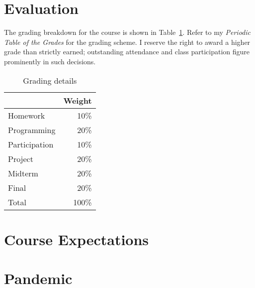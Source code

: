 \documentclass[11pt]{article}
\begin{document}
\section{Evaluation}

The grading breakdown for the course
is shown in Table~\ref{tab:grading}.
Refer to my \emph{Periodic Table of the Grades}
for the grading scheme.
I reserve the right to award a higher grade than strictly earned;
outstanding attendance and class participation
figure prominently in such decisions.

\begin{table}[htb]
  \centering
  \begin{tabular}{lr}
    \toprule
    & Weight \\
    \midrule
    Homework      & 10\%   \\
    Programming   & 20\%   \\
    Participation & 10\%   \\
    Project       & 20\%   \\
    Midterm       & 20\%   \\
    Final         & 20\%   \\
    \midrule
    Total         & 100\%  \\
    \bottomrule
  \end{tabular}
  \caption{Grading details}
  \label{tab:grading}
\end{table}
\begin{comment}
#+ORGTBL: SEND grades orgtbl-to-latex :splice nil :skip 0 :booktabs t
|               | Weight |
|               |    <r> |
|---------------+--------|
| Homework      |    10%
| Programming   |    20%
| Participation |    10%
| Project       |    20%
| Midterm       |    20%
| Final         |    20%
|---------------+--------|
| Total         |   100%
#+TBLFM: @11$2=100*vsum(@I..II);%
\end{comment}

\section{Course Expectations}



\section{Pandemic}


\end{document}
